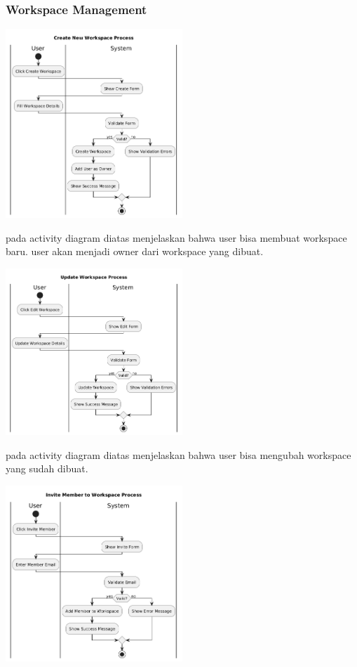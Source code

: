 \subsubsection*{Workspace Management}
\begin{center}
    \includegraphics[width=0.5\textwidth]{assets/activity_diagrams/workspace_create.png}
\end{center}
pada activity diagram diatas menjelaskan bahwa user bisa membuat workspace baru.
user akan menjadi owner dari workspace yang dibuat.
\begin{center}
    \includegraphics[width=0.5\textwidth]{assets/activity_diagrams/workspace_update.png}
\end{center}
pada activity diagram diatas menjelaskan bahwa user bisa mengubah workspace yang sudah dibuat.
\begin{center}
    \includegraphics[width=0.5\textwidth]{assets/activity_diagrams/workspace_invite.png}
\end{center}
